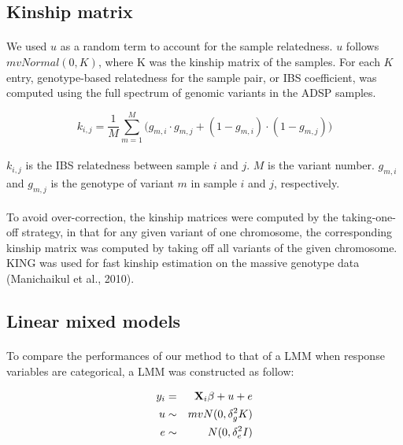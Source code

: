 \documentclass[12pt]{article}
\begin{document}
\subsection*{Kinship matrix}

\paragraph{}{
We used $u$ as a random term to account for the sample relatedness. $u$ follows $mvNormal(0, K)$, where K was the kinship matrix of the samples. For each $K$ entry, genotype-based relatedness for the sample pair, or IBS coefficient, was computed using the full spectrum of genomic variants in the ADSP samples.
}

\begin{equation}
k_{i, j}  = \frac{1}{M} \sum_{m = 1}^M ({g_{m, i}  \cdot g_{m, j} + (1 - g_{m, i}) \cdot (1 - g_{m, j}))}
\end{equation}

\paragraph{}{
$k_{i, j}$ is the IBS relatedness between sample $i$ and $j$. $M$ is the variant number. $g_{m, i}$ and $g_{m, j}$ is the genotype of variant $m$ in sample $i$ and $j$, respectively.
}

\paragraph{}{
To avoid over-correction, the kinship matrices were computed by the taking-one-off strategy, in that for any given variant of one chromosome, the corresponding kinship matrix was computed by taking off all variants of the given chromosome. KING was used for fast kinship estimation on the massive genotype data (Manichaikul et al., 2010).
}

\subsection*{Linear mixed models}

\paragraph{}{
To compare the performances of our method to that of a LMM when response variables are categorical, a LMM was constructed as follow: 
}

\begin{eqnarray}
   y_i & = &  \bold{X}_i \beta + u + e \\
   u & \sim & mvN(0, \delta^2_g K) \\
   e & \sim & N(0, \delta^2_e I)
\end{eqnarray}
\end{document}
